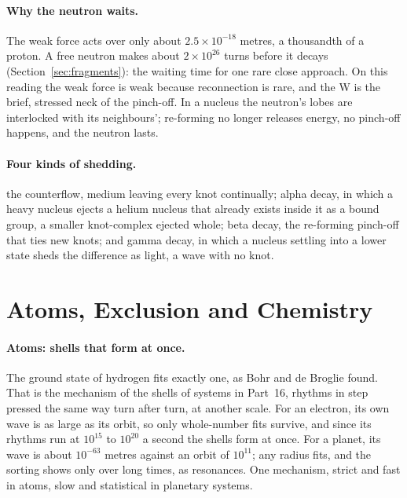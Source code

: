 \documentclass[11pt,a4paper]{article}
\begin{document}
\paragraph{Why the neutron waits.} The weak force acts over only about $2.5\times10^{-18}$ metres, a thousandth of a proton.  A free neutron makes about $2\times10^{26}$ turns before it decays (Section~\ref{sec:fragments}): the waiting time for one rare close approach. On this reading the weak force is weak because reconnection is rare, and the W is the brief, stressed neck of the pinch-off. In a nucleus the neutron's lobes are interlocked with its neighbours'; re-forming no longer releases energy, no pinch-off happens, and the neutron lasts.

\paragraph{Four kinds of shedding.}  the counterflow, medium leaving every knot continually; alpha decay, in which a heavy nucleus ejects a helium nucleus that already exists inside it as a bound group, a smaller knot-complex ejected whole; beta decay, the re-forming pinch-off that ties new knots; and gamma decay, in which a nucleus settling into a lower state sheds the difference as light, a wave with no knot.

\section{Atoms, Exclusion and Chemistry}
\label{sec:atomic}

\paragraph{Atoms: shells that form at once.}  The ground state of hydrogen fits exactly one, as Bohr and de Broglie found. That is the mechanism of the shells of systems in Part~16, rhythms in step pressed the same way turn after turn, at another scale.  For an electron, its own wave is as large as its orbit, so only whole-number fits survive, and since its rhythms run at $10^{15}$ to $10^{20}$ a second the shells form at once. For a planet, its wave is about $10^{-63}$ metres against an orbit of $10^{11}$; any radius fits, and the sorting shows only over long times, as resonances. One mechanism, strict and fast in atoms, slow and statistical in planetary systems.
\end{document}
